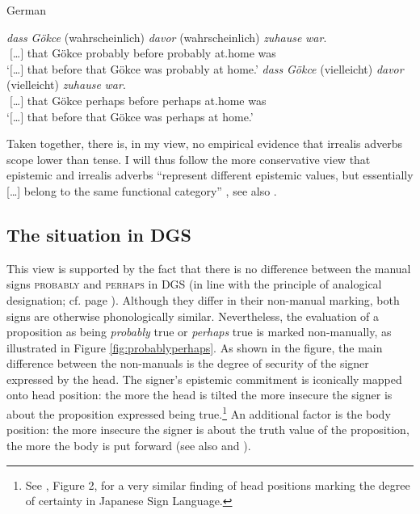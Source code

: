 \begin{exe}
\ex German\label{spokengermantemporalprobalbyperhaps}\begin{xlist} 
\ex \gll{\textcolor{white}{`}$[$\dots $]$} {\textit{dass}} {\textit{Gökce}} {(wahrscheinlich)} {\textit{davor}} {(wahrscheinlich)} {\textit{zuhause}} {\textit{war}}.\\
{\textcolor{white}{`}$[$\dots $]$} {that} {Gökce} {probably} {before} {probably} {at.home} {was}\\
\trans `$[$\dots $]$ that before that Gökce was probably at home.' \label{spokengermantemporalprobalbyperhapsa}
\ex \gll{\textcolor{white}{`}$[$\dots $]$} {\textit{dass}} {\textit{Gökce}} {(vielleicht)} {\textit{davor}} {(vielleicht)} {\textit{zuhause}} {\textit{war}}.\\
{\textcolor{white}{`}$[$\dots $]$} {that} {Gökce} {perhaps} {before} {perhaps} {at.home} {was}\\
\trans `$[$\dots $]$ that before that Gökce was perhaps at home.' \label{spokengermantemporalprobalbyperhapsb}
\end{xlist}
\end{exe}

\noindent Taken together, there is, in my view, no empirical evidence that irrealis adverbs scope lower than tense. I will thus follow the more conservative view that epistemic and irrealis adverbs ``represent different epistemic values, but essentially [\dots ] belong to the same functional category'' \citep[64]{nordstrom2010modality}, see also \citet{bybee1985morphology, palmer1986mood, palmer2001mood}.


\subsection{The situation in DGS}
This view is supported by the fact that there is no difference between the manual signs \textsc{probably} and \textsc{perhaps} in DGS (in line with the principle of analogical designation; cf. page \pageref{analogicaldesignation}). Although they differ in their non-manual marking, both signs are otherwise phonologically similar. Nevertheless, the evaluation of a proposition as being \textit{probably} true or \textit{perhaps} true is marked non-manually, as illustrated in Figure \ref{fig:probablyperhaps}. As shown in the figure, the main difference between the non-manuals is the degree of security of the signer expressed by the head. The signer's epistemic commitment is iconically mapped onto head position: the more the head is tilted the more insecure the signer is about the proposition expressed being true.\footnote{ See \citet[5]{matsuoka2016notes}, Figure 2, for a very similar finding of head positions marking the degree of certainty in Japanese Sign Language.} An additional factor is the body position: the more insecure the signer is about the truth value of the proposition, the more the body is put forward (see also \citealt[131, 559]{herrmann2013modal} and \citealt[131, 559]{happ2014vork}). 

